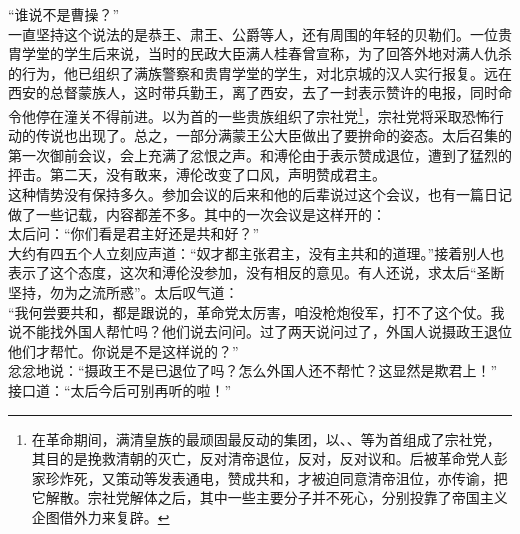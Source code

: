“谁说不是曹操？”\\

一直坚持这个说法的是恭王、肃王、公爵等人，还有周围的年轻的贝勒们。一位贵胄学堂的学生后来说，当时的民政大臣满人桂春曾宣称，为了回答外地对满人仇杀的行为，他已组织了满族警察和贵胄学堂的学生，对北京城的汉人实行报复。远在西安的总督蒙族人，这时带兵勤王，离了西安，去了一封表示赞许的电报，同时命令他停在潼关不得前进。以为首的一些贵族组织了宗社党\footnote{在革命期间，满清皇族的最顽固最反动的集团，以、、等为首组成了宗社党，其目的是挽救清朝的灭亡，反对清帝退位，反对，反对议和。后被革命党人彭家珍炸死，又策动等发表通电，赞成共和，才被迫同意清帝沮位，亦传谕，把它解散。宗社党解体之后，其中一些主要分子并不死心，分别投靠了帝国主义企图借外力来复辟。}，宗社党将采取恐怖行动的传说也出现了。总之，一部分满蒙王公大臣做出了要拚命的姿态。太后召集的第一次御前会议，会上充满了忿恨之声。和溥伦由于表示赞成退位，遭到了猛烈的抨击。第二天，没有敢来，溥伦改变了口风，声明赞成君主。\\

这种情势没有保持多久。参加会议的后来和他的后辈说过这个会议，也有一篇日记做了一些记载，内容都差不多。其中的一次会议是这样开的：\\

太后问：“你们看是君主好还是共和好？”\\

大约有四五个人立刻应声道：“奴才都主张君主，没有主共和的道理。”接着别人也表示了这个态度，这次和溥伦没参加，没有相反的意见。有人还说，求太后“圣断坚持，勿为之流所惑”。太后叹气道：\\

“我何尝要共和，都是跟说的，革命党太厉害，咱没枪炮役军，打不了这个仗。我说不能找外国人帮忙吗？他们说去问问。过了两天说问过了，外国人说摄政王退位他们才帮忙。你说是不是这样说的？”\\

忿忿地说：“摄政王不是已退位了吗？怎么外国人还不帮忙？这显然是欺君上！”\\

接口道：“太后今后可别再听的啦！”\\

